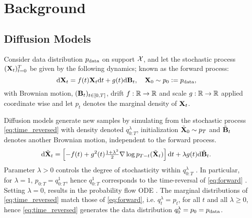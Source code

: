 \section{Background} \label{sec:background}

\subsection{Diffusion Models}
Consider data distribution $p_{\textup{data}}$ on support $\mathcal{X}$, and let the stochastic process $(\mathbf{X}_t)_{t=0}^T$ be given by the following dynamics; known as the forward process:
    \begin{equation}
          \label{eq:forward}
            \mathrm{d} \mathbf{X}_t = f(t)\mathbf{X}_t \mathrm{d} t + g(t) \mathrm{d} \mathbf{B}_t  ,\quad \mathbf{X}_0 \sim p_0\vcentcolon=p_{\textup{data}},
        \end{equation}
        with Brownian motion, $(\mathbf{B}_t)_{t \in \left[0,T\right]}$, drift
        $f: \mathbb{R} \to \mathbb{R}$ and scale $g: \mathbb{R} \to \mathbb{R}$ applied coordinate wise and let $p_t$ denotes the marginal density of $\mathbf{X}_t$.

    Diffusion models \citep{song2020denoising, song2021scorebased, ho2020denoising} generate new samples by simulating from the stochastic process \eqref{eq:time_reversed} with density denoted $q^\lambda_{0:T}$, initialization $\tilde{\mathbf{X}}_0 \sim p_T$ and $\tilde{\mathbf{B}}_t$ denotes another Brownian motion, independent to the forward process. 
    \begin{equation}\small 
      \label{eq:time_reversed}
      \mathrm{d} \tilde{\mathbf{X}}_t = \left[-f(t) + g^2(t) \tfrac{1+\lambda^2}{2}\nabla \log p_{T-t}(\tilde{\mathbf{X}}_t) \right] \mathrm{d} t + \lambda g(t)
      \mathrm{d} \tilde{\mathbf{B}}_t.
    \end{equation}
    Parameter $\lambda>0$ controls the degree of stochasticity
    within $q^\lambda_{0:T}$ \citep{diffnormflow, zhang2022fast}. In particular, for $\lambda=1$, $p_{0:T}=q^1_{0:T}$, hence $q^1_{0:T}$ corresponds to the time-reversal of \eqref{eq:forward} \citep{haussmann1986time,anderson1965iterative}. Setting $\lambda=0$, results in the probability flow ODE \citep{song2021scorebased}. The marginal distributions of \eqref{eq:time_reversed} match those of \eqref{eq:forward}, i.e. $q^\lambda_t = p_t$, for all $t$ and all $\lambda\geq 0$, hence \eqref{eq:time_reversed} generates the data distribution $q^\lambda_0=p_0=p_{\textup{data}}$.
    

